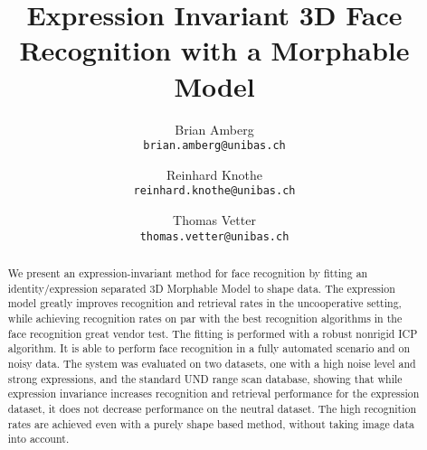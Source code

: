\documentclass[10pt,twocolumn,letterpaper]{article}
\begin{document}
\title{Expression Invariant 3D Face Recognition with a Morphable Model}

\author{Brian Amberg\\
{\tt\small brian.amberg@unibas.ch} \and
Reinhard Knothe\\
{\tt\small reinhard.knothe@unibas.ch} \and
Thomas Vetter\\
{\tt\small thomas.vetter@unibas.ch} 
}

\maketitle

\begin{abstract}
  We present an expression-invariant method for face recognition by fitting an
  identity/expression separated 3D Morphable Model to shape data. The
  expression model greatly improves recognition and retrieval rates in the
  uncooperative setting, while achieving recognition rates on par with the best
  recognition algorithms in the face recognition great vendor test. The
  fitting is performed with a robust nonrigid ICP algorithm. It is able to
  perform face recognition in a fully automated scenario and on noisy data.
  The system was evaluated on two datasets, one
  with a high noise level and strong expressions, and the standard UND range
  scan database, showing that while expression invariance increases recognition
  and retrieval performance for the expression dataset, it does not decrease
  performance on the neutral dataset. The high recognition rates are achieved
  even with a purely shape based method, without taking image data into
  account.
\end{abstract}

\end{document}
